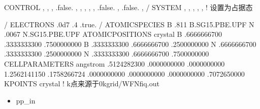 \documentclass[a4paper,12pt,english]{sphinxmanual}
\begin{document}
\begin{sphinxVerbatim}[commandchars=\\\{\}]
 CONTROL
                          ,
                    ,
                   ,
                    .false. ,
                         ,
                         ,
                     ,
                         ,
                       .false. ,
                       .false. ,
 /
 SYSTEM
                         ,
                           ,
                          ,
                        ,
                         ,     ! 设置为占据态

 /
 ELECTRONS
              
              .0d\PYGZhy{}7
              
              .4
           
            
            .true.
/
ATOMIC\PYGZus{}SPECIES
B      .811 B.SG15.PBE.UPF
N      .0067 N.SG15.PBE.UPF
ATOMIC\PYGZus{}POSITIONS crystal
B            .6666666700       .3333333300       .7500000000
B            .3333333300       .6666666700       .2500000000
N            .6666666700       .3333333300       .2500000000
N            .3333333300       .6666666700       .7500000000
CELL\PYGZus{}PARAMETERS angstrom
      .5124282300       .0000000000       .0000000000
     \PYGZhy{}1.2562141150       .1758266724       .0000000000
      .0000000000       .0000000000       .7072650000
K\PYGZus{}POINTS crystal   ! k点来源于0\PYGZhy{}kgrid/WFN\PYGZus{}fiq.out
\end{sphinxVerbatim}
\begin{itemize}
\item {} 
\sphinxAtStartPar
pp\_in

\end{itemize}
\end{document}
